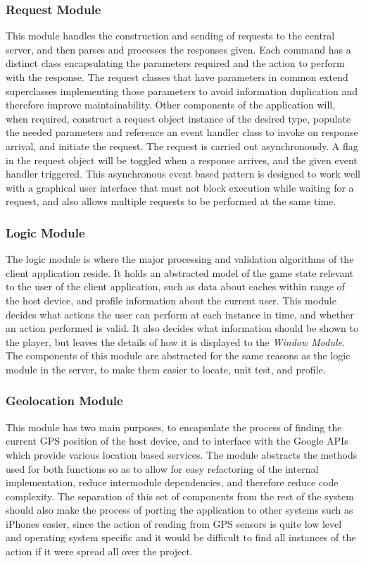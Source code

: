 \subsubsection{Request Module}
This module handles the construction and sending of requests to the central server, and then parses and processes the responses given. Each command has a distinct class encapsulating the parameters required and the action to perform with the response. The request classes that have parameters in common extend superclasses implementing those parameters to avoid information duplication and therefore improve maintainability. Other components of the application will, when required, construct a request object instance of the desired type, populate the needed parameters and reference an event handler class to invoke on response arrival, and initiate the request. The request is carried out asynchronously. A flag in the request object will be toggled when a response arrives, and the given event handler triggered. This asynchronous event based pattern is designed to work well with a graphical user interface that must not block execution while waiting for a request, and also allows multiple requests to be performed at the same time.

\subsubsection{Logic Module}
The logic module is where the major processing and validation algorithms of the client application reside. It holds an abstracted model of the game state relevant to the user of the client application, such as data about caches within range of the host device, and profile information about the current user. This module decides what actions the user can perform at each instance in time, and whether an action performed is valid. It also decides what information should be shown to the player, but leaves the details of how it is displayed to the \emph{Window Module}. The components of this module are abstracted for the same reasons as the logic module in the server, to make them easier to locate, unit test, and profile.

\subsubsection{Geolocation Module}
This module has two main purposes, to encapsulate the process of finding the current GPS position of the host device, and to interface with the Google APIs which provide various location based services. The module abstracts the methods used for both functions so as to allow for easy refactoring of the internal implementation, reduce intermodule dependencies, and therefore reduce code complexity. The separation of this set of components from the rest of the system should also make the process of porting the application to other systems such as iPhones easier, since the action of reading from GPS sensors is quite low level and operating system specific and it would be difficult to find all instances of the action if it were spread all over the project.


